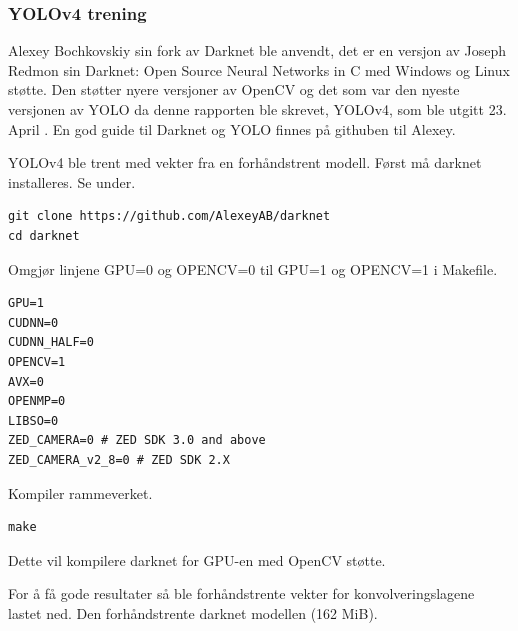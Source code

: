 
\subsubsection{YOLOv4 trening}

Alexey Bochkovskiy sin fork av Darknet ble anvendt, det er en versjon av Joseph Redmon sin Darknet: Open Source Neural Networks in C med Windows og Linux støtte. Den støtter nyere versjoner av OpenCV og det som var den nyeste versjonen av YOLO da denne rapporten ble skrevet, YOLOv4, som ble utgitt 23. April \cite{Bochkovskiy m.fl. 2020}. En god guide til Darknet og YOLO finnes på githuben til Alexey. \cite{Bochkovskiy 2020}


YOLOv4 ble trent med vekter fra en forhåndstrent modell. Først må darknet installeres. Se under.

\begin{verbatim}
git clone https://github.com/AlexeyAB/darknet
cd darknet
\end{verbatim}

Omgjør linjene GPU=0 og OPENCV=0 til GPU=1 og OPENCV=1 i Makefile.

\begin{lstlisting}[language={}, caption=De første linjene i Makefile]
GPU=1
CUDNN=0
CUDNN_HALF=0
OPENCV=1
AVX=0
OPENMP=0
LIBSO=0
ZED_CAMERA=0 # ZED SDK 3.0 and above
ZED_CAMERA_v2_8=0 # ZED SDK 2.X
\end{lstlisting}

Kompiler rammeverket.

\begin{verbatim}
make
\end{verbatim}

Dette vil kompilere darknet for GPU-en med OpenCV støtte.


For å få gode resultater så ble forhåndstrente vekter for konvolveringslagene lastet ned. Den forhåndstrente darknet modellen (162 MiB).

